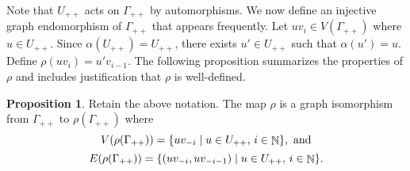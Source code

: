 \documentclass{article}
\DeclareMathOperator\bbN{\mathbb{N}}
\theoremstyle{definition}
\newtheorem{proposition}[theorem]{Proposition}
\begin{document}
Note that $U_{++}$ acts on $\Gamma_{++}$ by automorphisms. We now define an injective graph endomorphism of $\Gamma_{++}$ that appears frequently. Let $uv_{i}\in V(\Gamma_{++})$ where $u\in U_{++}$. Since $\alpha(U_{++}) = U_{++}$, there exists $u'\in U_{++}$ such that $\alpha(u') = u$. Define $\rho(uv_{i}) = u'v_{i-1}$. The following proposition summarizes the properties of $\rho$ and includes justification that $\rho$ is well-defined.

\begin{proposition}\label{prop:properties_of_induced_map}
Retain the above notation. The map $\rho$ is a graph isomorphism from $\Gamma_{++}$ to $\rho(\Gamma_{++})$ where
\[
  V(\rho(\Gamma_{++}))=\{uv_{-i}\mid u\in U_{++}\hbox{, }i \in\bbN\}, \text{ and}
\]
\vspace{-0.4cm}
\[
  E(\rho(\Gamma_{++}))=\{(uv_{-i},uv_{-i-1})\mid u\in U_{++}\hbox{, }i \in\bbN\}.
\]
\end{proposition}
\end{document}

